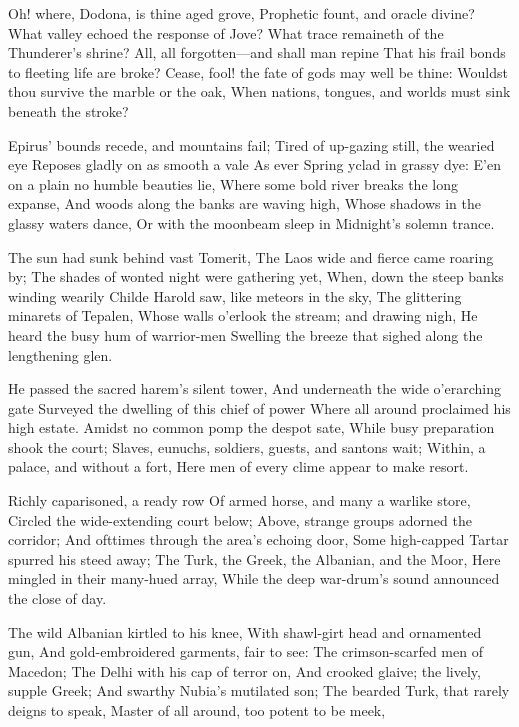 \documentclass[10pt,twocolumn]{book}
\begin{document}
   Oh! where, Dodona, is thine aged grove,
   Prophetic fount, and oracle divine?
   What valley echoed the response of Jove?
   What trace remaineth of the Thunderer's shrine?
   All, all forgotten---and shall man repine
   That his frail bonds to fleeting life are broke?
   Cease, fool! the fate of gods may well be thine:
   Wouldst thou survive the marble or the oak,
When nations, tongues, and worlds must sink beneath the stroke?


   Epirus' bounds recede, and mountains fail;
   Tired of up-gazing still, the wearied eye
   Reposes gladly on as smooth a vale
   As ever Spring yclad in grassy dye:
   E'en on a plain no humble beauties lie,
   Where some bold river breaks the long expanse,
   And woods along the banks are waving high,
   Whose shadows in the glassy waters dance,
Or with the moonbeam sleep in Midnight's solemn trance.


   The sun had sunk behind vast Tomerit,
   The Laos wide and fierce came roaring by;
   The shades of wonted night were gathering yet,
   When, down the steep banks winding wearily
   Childe Harold saw, like meteors in the sky,
   The glittering minarets of Tepalen,
   Whose walls o'erlook the stream; and drawing nigh,
   He heard the busy hum of warrior-men
Swelling the breeze that sighed along the lengthening glen.


   He passed the sacred harem's silent tower,
   And underneath the wide o'erarching gate
   Surveyed the dwelling of this chief of power
   Where all around proclaimed his high estate.
   Amidst no common pomp the despot sate,
   While busy preparation shook the court;
   Slaves, eunuchs, soldiers, guests, and santons wait;
   Within, a palace, and without a fort,
Here men of every clime appear to make resort.


   Richly caparisoned, a ready row
   Of armed horse, and many a warlike store,
   Circled the wide-extending court below;
   Above, strange groups adorned the corridor;
   And ofttimes through the area's echoing door,
   Some high-capped Tartar spurred his steed away;
   The Turk, the Greek, the Albanian, and the Moor,
   Here mingled in their many-hued array,
While the deep war-drum's sound announced the close of day.


   The wild Albanian kirtled to his knee,
   With shawl-girt head and ornamented gun,
   And gold-embroidered garments, fair to see:
   The crimson-scarfed men of Macedon;
   The Delhi with his cap of terror on,
   And crooked glaive; the lively, supple Greek;
   And swarthy Nubia's mutilated son;
   The bearded Turk, that rarely deigns to speak,
Master of all around, too potent to be meek,
\end{document}
